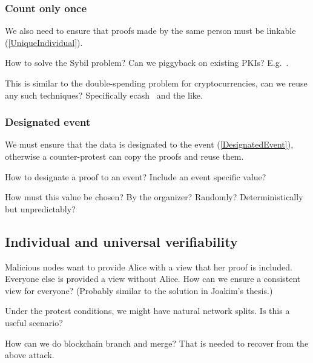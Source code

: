\subsubsection{Count only once}

We also need to ensure that proofs made by the same person must be linkable 
(\cref{UniqueIndividual}).

\begin{frame}
  \begin{question}
    How to solve the Sybil problem?
    Can we piggyback on existing \acp{PKI}?
    E.g.~\cite{Cinderella}.
  \end{question}
  \begin{question}
    This is similar to the double-spending problem for cryptocurrencies, can 
    we reuse any such techniques?
    Specifically ecash~\cite{ecash} and the like.
  \end{question}
\end{frame}

\subsubsection{Designated event}

We must ensure that the data is designated to the event 
(\cref{DesignatedEvent}), otherwise a counter-protest can copy the proofs and 
reuse them.

\begin{frame}
  \begin{question}
    How to designate a proof to an event?
    Include an event specific value?
  \end{question}
  \begin{question}
    How must this value be chosen?
    By the organizer?
    Randomly?
    Deterministically but unpredictably?
  \end{question}
\end{frame}

\subsection{Individual and universal verifiability}

\begin{frame}
  \begin{question}
    Malicious nodes want to provide Alice with a view that her proof is 
    included.
    Everyone else is provided a view without Alice.
    How can we ensure a consistent view for everyone?
    (Probably similar to the solution in Joakim's thesis.)
  \end{question}

  \begin{question}
    Under the protest conditions, we might have natural network splits.
    Is this a useful scenario?
  \end{question}

  \begin{question}
    How can we do blockchain branch and merge?
    That is needed to recover from the above attack.
  \end{question}
\end{frame}

